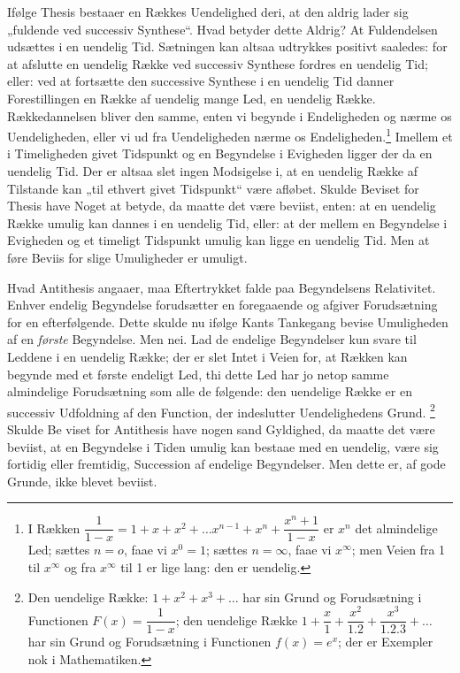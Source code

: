 \documentclass[12pt,a4paper]{book}
\renewcommand{\thefootnote}{*)}
\begin{document}
Ifølge Thesis bestaaer en Rækkes Uendelighed deri, at den aldrig lader
sig „fuldende ved successiv Synthese“. Hvad betyder dette Aldrig? At
Fuldendelsen udsættes i en uendelig Tid. Sætningen kan altsaa
udtrykkes positivt saaledes: for at afslutte en uendelig Række ved
successiv Synthese fordres en uendelig Tid; eller: ved at fortsætte den
successive Synthese i en uendelig Tid danner Forestillingen en Række af
uendelig mange Led, en uendelig Række.
Rækkedannelsen bliver den samme, enten vi begynde i Endeligheden og
nærme os Uendeligheden, eller vi ud fra Uendeligheden nærme os
Endeligheden.\footnote{%
I Rækken $\dfrac{1}{1-x} = 1 + x + x^2 + \ldots x^{n-1} + x^n +
\dfrac{x^n + 1}{1 - x}$ er $x^n$ det almindelige Led; sættes $n = o$,
faae vi $x^0 = 1$; sættes $n = \infty$, faae vi $x^\infty$; men Veien
fra 1 til $x^\infty$ og fra $x^\infty$ til 1 er lige lang: den er
uendelig.} Imellem et i Timeligheden givet Tidspunkt og en Begyndelse
i Evigheden ligger der da en uendelig Tid. Der er altsaa slet ingen
Modsigelse i, at en uendelig Række af Tilstande kan „til ethvert givet
Tidspunkt“ være afløbet. Skulde Beviset for Thesis have Noget at
betyde, da maatte det være beviist, enten: at en uendelig Række umulig
kan dannes i en uendelig Tid, eller: at der mellem en Begyndelse i
Evigheden og et timeligt Tidspunkt umulig kan ligge en uendelig Tid.
Men at føre Beviis for slige Umuligheder er umuligt.

Hvad Antithesis angaaer, maa Eftertrykket falde paa Begyndelsens
Relativitet. Enhver endelig Begyndelse forudsætter en foregaaende og
afgiver Forudsætning for en efterfølgende. Dette skulde nu ifølge
Kants Tankegang bevise Umuligheden af en \emph{første} Begyndelse. Men
nei. Lad de endelige Begyndelser kun svare til Leddene i en uendelig
Række; der er slet Intet i Veien for, at Rækken kan begynde med et
første endeligt Led, thi dette Led har jo netop samme almindelige
Forudsætning som alle de følgende: den uendelige Række er en successiv
Udfoldning af den Function, der indeslutter Uendelighedens Grund.%
\renewcommand{\thefootnote}{**)}%
\footnote{%
Den uendelige Række: $1 + x^2 + x^3 + \ldots$ har sin Grund og
Forudsætning i Functionen $F(x) = \dfrac{1}{1-x}$; den uendelige Række
$1 + \dfrac{x}{1} + \dfrac{x^2}{1.2} + \dfrac{x^3}{1.2.3} + \ldots$
har sin Grund og Forudsætning i Functionen $f(x) = e^x$; der er
Exempler nok i Mathematiken.}%
\renewcommand{\thefootnote}{*)}
Skulde Be\-%
viset for Antithesis have nogen sand Gyldighed, da maatte det være
beviist, at en Begyndelse i Tiden umulig kan bestaae med en uendelig,
være sig fortidig eller fremtidig, Succession af endelige
Begyndelser. Men dette er, af gode Grunde, ikke blevet beviist.
\end{document}
